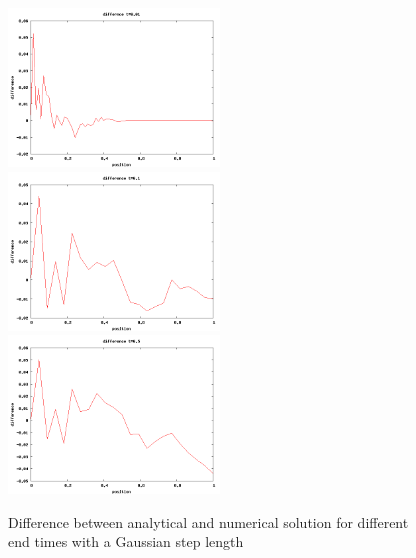 \documentclass[a4wide,12pt]{article}
\begin{document}
\begin{figure}[p]
 \includegraphics[width=0.5\textwidth]{difference001gauss}
 \includegraphics[width=0.5\textwidth]{difference01gauss}
 \includegraphics[width=0.5\textwidth]{difference05gauss}
 \caption{Difference between analytical and numerical solution for different end times with a Gaussian step length}
 \label{fig:04}
\end{figure}
\end{document}
